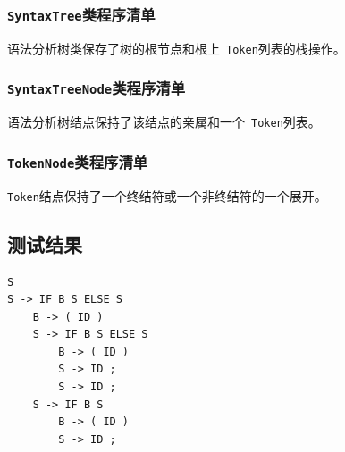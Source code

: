 \subsubsection{\texttt{SyntaxTree}类程序清单}
语法分析树类保存了树的根节点和根上~\verb|Token|列表的栈操作。
{\linespread{1}
}
\subsubsection{\texttt{SyntaxTreeNode}类程序清单}
语法分析树结点保持了该结点的亲属和一个~\verb|Token|列表。
{\linespread{1}
}
\subsubsection{\texttt{TokenNode}类程序清单}
\verb|Token|结点保持了一个终结符或一个非终结符的一个展开。
{\linespread{1}
}
\subsection{测试结果}
{\linespread{1}
\begin{lstlisting}[caption=本次实验的实验用例]
S
S -> IF B S ELSE S
    B -> ( ID )
    S -> IF B S ELSE S
        B -> ( ID )
        S -> ID ;
        S -> ID ;
    S -> IF B S
        B -> ( ID )
        S -> ID ;
\end{lstlisting}}